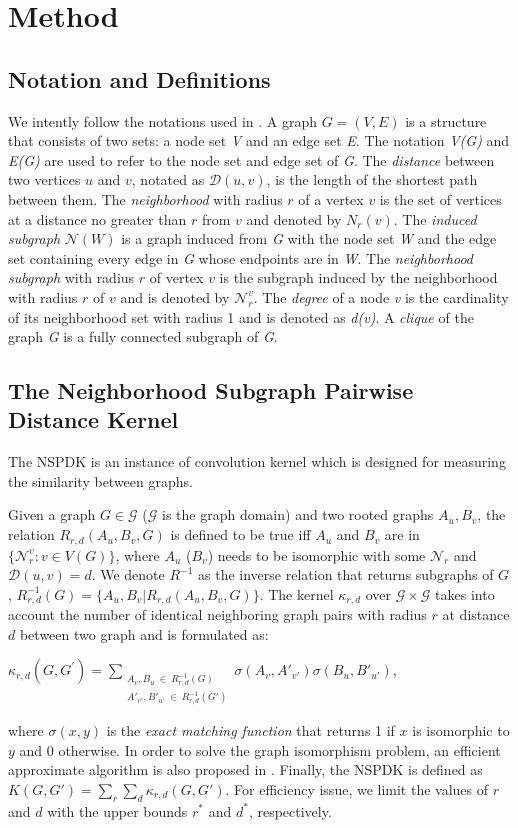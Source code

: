 \documentclass{esannV2}
\begin{document}
\section{Method}\label{method}
\subsection{Notation and Definitions}
We intently follow the notations used in \cite{nspdk}. A graph $G = (V,E)$ is a structure that consists of two sets: a node set \textit{V} and an edge set \textit{E}. The notation \textit{V(G)} and \textit{E(G)} are used to refer to the node set and edge set of \textit{G}. The \textit{distance} between two vertices $u$ and $v$, notated as $\mathcal{D}(u,v)$, is the length of the shortest path between them. The \textit{neighborhood} with radius $r$ of a vertex $v$ is the set of vertices at a distance no greater than $r$ from $v$ and denoted by $N_r(v)$. The \textit{induced subgraph} $\mathcal{N}(W)$ is a graph induced from \textit{G} with the node set \textit{W} and the edge set containing every edge in \textit{G} whose endpoints  are in \textit{W}. The \textit{neighborhood subgraph} with radius $r$ of vertex $v$ is the subgraph induced by the neighborhood with radius $r$ of $v$ and is denoted by $\mathcal{N}_{r}^{v}$. The \textit{degree} of a node \textit{v} is the cardinality of its neighborhood set with radius 1 and is denoted as \textit{d(v)}. A \textit{clique} of the graph \textit{G} is a fully connected subgraph of \textit{G}.
\subsection{The Neighborhood Subgraph Pairwise Distance Kernel}
The NSPDK is an instance of convolution kernel which is designed for measuring the similarity between graphs.

Given a graph $G \in \mathcal{G}$ ($\mathcal{G}$ is the graph domain) and two rooted graphs $A_u, B_v$, the relation $R_{r,d}(A_u, B_v, G)$ is defined to be true iff $A_u$ and $B_v$ are in $\lbrace \mathcal{N}_r^v: v \in V(G) \rbrace$, where $A_u$ ($B_v$) needs to be isomorphic with some $\mathcal{N}_r$ and $\mathcal{D}(u,v)= d$. We denote $R^{-1}$ as the inverse relation that returns subgraphs of $G$, $R^{-1}_{r,d}(G) = \lbrace A_u, B_v | R_{r,d}(A_u,B_v,G)\rbrace$. The kernel $\kappa_{r,d}$ over $\mathcal{G} \times \mathcal{G}$ takes into account the number of identical neighboring graph pairs with radius $r$ at distance $d$ between two graph and is formulated as:
\begin{center}
 $\kappa_{r,d}(G,G^{'}) = \sum\limits_{\substack{A_v, B_u \ \in \ R_{r,d}^{-1}(G) \\ {A'}_{v'}, {B'}_{u'} \ \in \ R_{r,d}^{-1}(G') }} { \sigma(A_v,A'_{v'})\sigma(B_u,B'_{u'}) }$,
\end{center}
where $\sigma(x,y)$ is the \textit{exact matching function} that returns 1 if $x$ is isomorphic to $y$ and 0 otherwise. In order to solve the graph isomorphism problem, an efficient approximate algorithm is also proposed in \cite{nspdk}. Finally, the NSPDK is defined as $K(G,G') = \sum\limits_{r}{\sum\limits_{d}{\kappa_{r,d}(G,G')}}$. For efficiency issue, we limit the values of $r$ and $d$ with the upper bounds $r^*$ and $d^*$, respectively.
\end{document}
